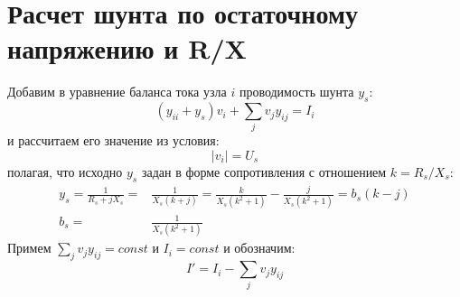 \documentclass[lettersize,journal]{IEEEtran}
\begin{document}
	
\onecolumn









\section{Расчет шунта по остаточному напряжению и R/X}
Добавим в уравнение баланса тока узла \(i\) проводимость шунта \(y_s\):
\begin{equation}
	\label{eqn_current_balance}
	(y_{ii} + y_s)v_i + \sum_{j}{v_jy_{ij}} = I_i
\end{equation}
и рассчитаем его значение из условия:
\begin{equation}
 \label{eqn_Us_magnitude}
 |v_i|=U_s
\end{equation} 
полагая, что исходно \(y_s\) задан в форме сопротивления с отношением \(k=R_s/X_s\):
\begin{equation}
	\label{eqn_conductance}
	\begin{split}
	y_s = \frac{1}{R_s+jX_s}=&\frac{1}{X_s(k+j)}=\frac{k}{X_s(k^2+1)} - \frac{j}{X_s(k^2+1)}=b_s(k-j) \\ b_s =& \frac{1}{X_s(k^2+1)}
	\end{split}
\end{equation}
Примем \(\sum_{j}{v_jy_{ij}}=const\) и \(I_i=const\) и обозначим:
\begin{equation}
	\label{eqn_composite_current}
	I'= I_i - \sum_{j}{v_jy_{ij}}
\end{equation}
\end{document}
